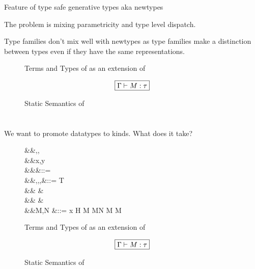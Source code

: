 \documentclass[manuscript,screen,nonacm]{acmart}
\begin{document}
Feature of type safe generative types aka newtypes

The problem is mixing parametricity and type level dispatch.

Type families don't mix well with newtypes as type families make a distinction between types
even if they have the same representations.


\begin{figure}[ht]
  \caption{Terms and Types of \SFR as an extension of \SFC}
  \label{fig:system-fcr-syntax}
\end{figure}

\begin{figure}[ht]
  \centering
  \begin{gather*}
    \fbox{$\Gamma \vdash M : \tau$}
  \end{gather*}
  \caption{Static Semantics of \SFR}
  \label{fig:sfr-typing}
\end{figure}




\section{\SFP}\label{sec:sfp} %
We want to promote datatypes to kinds. What does it take?
\begin{figure}[ht]
  \centering
  \begin{syntax}
     &&\alpha,\beta,\gamma \\
     &&x,y          \\
         &&\kappa                  &::= \star \mid \kappa \to \kappa \mid \syntaxhl{\tau \sim \sigma}\\
         &&\tau,\sigma,\gamma,\nu  &::= \alpha \mid T \mid {} \mid \tau \to \tau \mid \Forall {\alpha\co\kappa} \tau\\
    &&                        &\syntaxhl{\mid \sym \Co \mid \trans \nu \Co \mid \Co\At\tau \mid \Left \Co \mid \Right \Co} \\
    &&                        &\syntaxhl{\mid  \Cast \Co \Co}\\
         &&M,N                     &::= x \mid H \mid {} M \mid M\App N \mid \TLam{\tau\co\kappa} M \mid M\App \tau
  \end{syntax}
  \caption{Terms and Types of \SFP as an extension of \SFC}
  \label{fig:system-fcp-syntax}
\end{figure}


\begin{figure}[ht]
  \centering
  \begin{gather*}
    \fbox{$\Gamma \vdash M : \tau$}
  \end{gather*}
  \caption{Static Semantics of \SFP}
  \label{fig:sfp-typing}
\end{figure}
\end{document}
